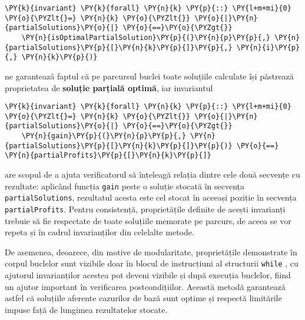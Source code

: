 \begin{sloppypar}
\begin{Verbatim}[commandchars=\\\{\}]
\PY{k}{invariant} \PY{k}{forall} \PY{n}{k} \PY{p}{::} \PY{l+m+mi}{0} \PY{o}{\PYZlt{}=} \PY{n}{k} \PY{o}{\PYZlt{}} \PY{o}{|}\PY{n}{partialSolutions}\PY{o}{|} \PY{o}{==}\PY{o}{\PYZgt{}} 
    \PY{n}{isOptimalPartialSolution}\PY{p}{(}\PY{n}{p}\PY{p}{,} \PY{n}{partialSolutions}\PY{p}{[}\PY{n}{k}\PY{p}{]}\PY{p}{,} \PY{n}{i}\PY{p}{,} \PY{n}{k}\PY{p}{)}
\end{Verbatim}
    ne garantează faptul că pe parcursul buclei toate soluțiile calculate își păstrează proprietatea de \textbf{soluție parțială optimă}, iar invariantul 
    \begin{Verbatim}[commandchars=\\\{\}]
\PY{k}{invariant} \PY{k}{forall} \PY{n}{k} \PY{p}{::} \PY{l+m+mi}{0} \PY{o}{\PYZlt{}=} \PY{n}{k} \PY{o}{\PYZlt{}} \PY{o}{|}\PY{n}{partialSolutions}\PY{o}{|} \PY{o}{==}\PY{o}{\PYZgt{}} 
    \PY{n}{gain}\PY{p}{(}\PY{n}{p}\PY{p}{,} \PY{n}{partialSolutions}\PY{p}{[}\PY{n}{k}\PY{p}{]}\PY{p}{)} \PY{o}{==} \PY{n}{partialProfits}\PY{p}{[}\PY{n}{k}\PY{p}{]}
\end{Verbatim}
    are scopul de a ajuta verificatorul să înțeleagă relația dintre cele două secvențe cu rezultate: aplicând funcția \texttt{gain} peste o soluție stocată în secvența \texttt{partialSolutions}, rezultatul acesta este cel stocat în aceeași poziție în secvența \texttt{partialProfits}. Pentru consistență, proprietățile definite de acești invarianți trebuie să fie respectate de toate soluțiile memorate pe parcurs, de aceea se vor repeta și în cadrul invarianților din celelalte metode.
    \par De asemenea, deoarece, din motive de modularitate, proprietățile demonstrate în corpul buclelor sunt vizibile doar în blocul de instrucțiuni al structurii \texttt{while} \cite{verification_optimization}, cu ajutorul invarianților acestea pot deveni vizibile și după execuția buclelor, fiind un ajutor important în verificarea postcondițiilor. Această metodă garantează astfel că soluțiile aferente cazurilor de bază sunt optime și respectă limitările impuse față de lungimea rezultatelor stocate. \\ \par


\end{sloppypar}
